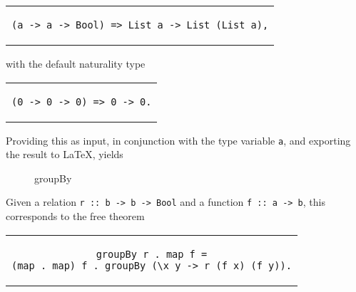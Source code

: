 \documentclass[../Dissertation.tex]{subfiles}
\begin{document}
\begin{center}
\begin{tabular}{c}
\begin{lstlisting}
(a -> a -> Bool) => List a -> List (List a),
\end{lstlisting}
\end{tabular}
\end{center}
with the default naturality type
\begin{center}
\begin{tabular}{c}
\begin{lstlisting}
(0 -> 0 -> 0) => 0 -> 0.
\end{lstlisting}
\end{tabular}
\end{center}
\noindent
Providing this as input, in conjunction with the type variable \lstinline{a}, and exporting the result to LaTeX, yields
\begin{figure}[H]
  \begin{center}
  \end{center}
  \caption{groupBy}
  \label{fig:groupBy}
\end{figure}
\noindent
Given a relation \lstinline{r :: b -> b -> Bool} and a function \lstinline{f :: a -> b}, this corresponds to the free theorem
\begin{center}
\begin{tabular}{c}
\begin{lstlisting}[basicstyle=\ttfamily,style=haskellStyle]
groupBy r . map f =
(map . map) f . groupBy (\x y -> r (f x) (f y)).
\end{lstlisting}
\end{tabular}
\end{center}
\end{document}
